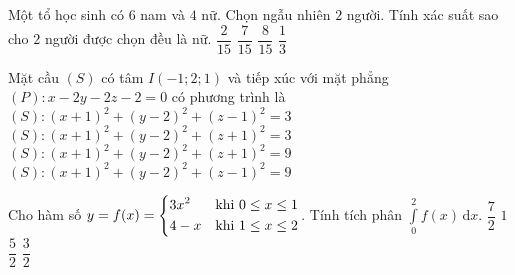\begin{ex}%
Một tổ học sinh có $6$ nam và $4$ nữ. Chọn ngẫu nhiên $2$ người. Tính xác suất sao cho $2$ người được chọn đều là nữ.
\choice
{\True $\dfrac{2}{15}$}
{$\dfrac{7}{15}$}
{$\dfrac{8}{15}$}
{$\dfrac{1}{3}$}
\end{ex}

\begin{ex}%
Mặt cầu $(S)$ có tâm $I(-1;2;1)$ và tiếp xúc với mặt phẳng $(P)\colon x-2y-2z-2=0$ có phương trình là
\choice
{$(S)\colon (x+1)^2+(y-2)^2+(z-1)^2=3$}
{$(S)\colon (x+1)^2+(y-2)^2+(z+1)^2=3$}
{$(S)\colon (x+1)^2+(y-2)^2+(z+1)^2=9$}
{\True $(S)\colon (x+1)^2+(y-2)^2+(z-1)^2=9$}
\end{ex}

\begin{ex}%
Cho hàm số $y=f(x)=\left\{\begin{aligned}&3x^2 &\text{khi}\ 0\le x\le 1\\ &4-x &\text{khi}\ 1\le x\le 2\end{aligned}\right.$. Tính tích phân $\displaystyle\int\limits_{0}^{2}f(x)\mathrm{\,d}x$.
\choice
{\True $\dfrac{7}{2}$}
{$1$}
{$\dfrac{5}{2}$}
{$\dfrac{3}{2}$}
\end{ex}

